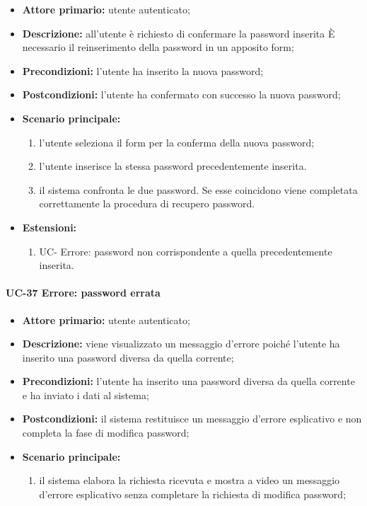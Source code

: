 	\begin{itemize}
		\item \textbf{Attore primario:} utente autenticato;

		\item \textbf{Descrizione:} all'utente è richiesto di confermare la password inserita  \`{E} necessario il reinserimento della password in un apposito form;

		\item \textbf{Precondizioni:} l'utente ha inserito la nuova password;

		\item \textbf{Postcondizioni:} l'utente ha confermato con successo la nuova password;

		\item \textbf{Scenario principale:}
	  		\begin{enumerate}
		  		\item l'utente seleziona il form per la conferma della nuova password;
		  		\item l'utente inserisce la stessa password precedentemente inserita.
		  		\item il sistema confronta le due password. Se esse coincidono viene completata correttamente la procedura di recupero password.
	  		\end{enumerate}
		\item \textbf{Estensioni:}
	  		\begin{enumerate}
		  		\item UC- Errore: password non corrispondente a quella precedentemente inserita.
	  		\end{enumerate}
	\end{itemize}

\paragraph{UC-37 Errore: password errata}


	\begin{itemize}
		\item \textbf{Attore primario:} utente autenticato;

		\item \textbf{Descrizione:}  viene visualizzato un messaggio d'errore poiché l'utente ha inserito una password diversa da quella corrente;

		\item \textbf{Precondizioni:} l'utente ha inserito una password diversa da quella corrente e ha inviato i dati al sistema;

		\item \textbf{Postcondizioni:} il sistema restituisce un messaggio d'errore esplicativo e non completa la fase di modifica password;

		\item \textbf{Scenario principale:}
	  		\begin{enumerate}
		  		\item il sistema elabora la richiesta ricevuta e mostra a video un messaggio d'errore esplicativo senza completare la richiesta di modifica password; 
	  		\end{enumerate}
	\end{itemize}

